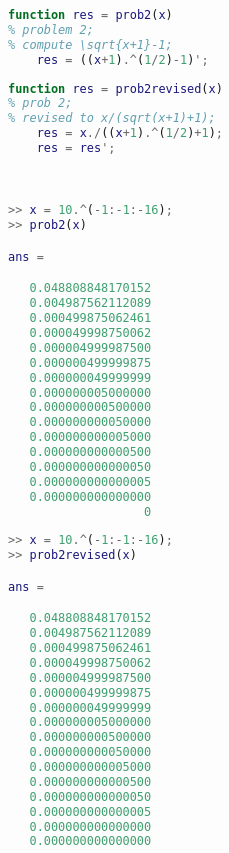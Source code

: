 \begin{lstlisting}[language = MATLAB]
function res = prob2(x)
% problem 2;
% compute \sqrt{x+1}-1;
    res = ((x+1).^(1/2)-1)';
\end{lstlisting}
\begin{lstlisting}[language = MATLAB]
function res = prob2revised(x)
% prob 2;
% revised to x/(sqrt(x+1)+1);
    res = x./((x+1).^(1/2)+1);
    res = res';
\end{lstlisting}
\\
\begin{minipage}{0.5\textwidth}
\begin{lstlisting}[language = MATLAB]
>> x = 10.^(-1:-1:-16);
>> prob2(x)

ans =

   0.048808848170152
   0.004987562112089
   0.000499875062461
   0.000049998750062
   0.000004999987500
   0.000000499999875
   0.000000049999999
   0.000000005000000
   0.000000000500000
   0.000000000050000
   0.000000000005000
   0.000000000000500
   0.000000000000050
   0.000000000000005
   0.000000000000000
                   0
\end{lstlisting}
\end{minipage}
\hspace{10pt}
\begin{minipage}{0.5\textwidth}
\begin{lstlisting}[language = MATLAB]
>> x = 10.^(-1:-1:-16);
>> prob2revised(x)

ans =

   0.048808848170152
   0.004987562112089
   0.000499875062461
   0.000049998750062
   0.000004999987500
   0.000000499999875
   0.000000049999999
   0.000000005000000
   0.000000000500000
   0.000000000050000
   0.000000000005000
   0.000000000000500
   0.000000000000050
   0.000000000000005
   0.000000000000000
   0.000000000000000
\end{lstlisting}
\end{minipage}
\\

